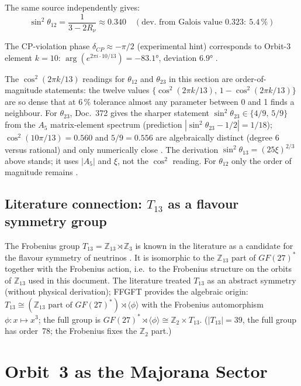 The same source independently gives:
\[
\sin^2\theta_{12}=\frac{1}{3-2R_\nu}\approx0.340
\quad(\text{dev.\ from Galois value }0.323{:}\ 5.4\,\%)
\]

The CP-violation phase $\delta_{CP}\approx-\pi/2$ (experimental hint)
corresponds to Orbit-3 element $k=10$:
$\arg(e^{2\pi i\cdot10/13})=-83.1°$, deviation $6.9°$ \SM.

\medskip\noindent The
$\cos^2(2\pi k/13)$ readings for $\theta_{12}$ and $\theta_{23}$ in this
section are order-of-magnitude statements: the twelve values
$\{\cos^2(2\pi k/13),\,1-\cos^2(2\pi k/13)\}$ are so dense that at $6\,\%$
tolerance almost any parameter between 0 and 1 finds a neighbour. For
$\theta_{23}$, Doc.~372 gives the sharper statement
$\sin^2\theta_{23}\in\{4/9,\,5/9\}$ from the $A_5$ matrix-element spectrum
(prediction $|\sin^2\theta_{23}-1/2| = 1/18$); $\cos^2(10\pi/13) = 0.560$ and
$5/9 = 0.556$ are algebraically distinct (degree 6 versus rational) and only
numerically close \BM. The derivation $\sin^2\theta_{13} = (25\xi)^{2/3}$
above stands; it uses $|A_5|$ and $\xi$, not the $\cos^2$ reading. For
$\theta_{12}$ only the order of magnitude remains \SM.

\subsection*{Literature connection: $T_{13}$ as a flavour symmetry group}

The Frobenius group $T_{13}=\mathbb{Z}_{13}\rtimes\mathbb{Z}_3$
is known in the literature as a candidate for the flavour symmetry of
neutrinos \cite{Hartmann2011}. It is isomorphic to the
$\mathbb{Z}_{13}$ part of $GF(27)^*$ together with the Frobenius action, i.e.\ to the
Frobenius structure on the orbits of $\mathbb{Z}_{13}$ used in this document.
The literature treated $T_{13}$ as an abstract symmetry (without
physical derivation); FFGFT provides the algebraic origin:
$T_{13}\cong(\mathbb{Z}_{13}\text{ part of }GF(27)^*)\rtimes\langle\phi\rangle$
with the Frobenius automorphism $\phi:x\mapsto x^3$; the full group is
$GF(27)^*\rtimes\langle\phi\rangle\cong\mathbb{Z}_2\times T_{13}$.
($|T_{13}|=39$, the full group has order~78; the Frobenius fixes the
$\mathbb{Z}_2$ part.)

\section{Orbit~3 as the Majorana Sector \BM}

